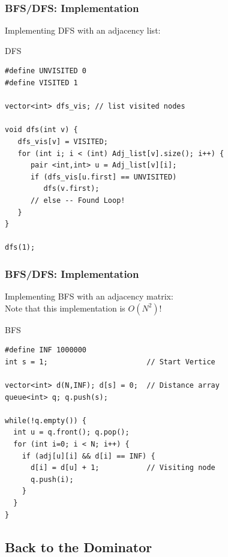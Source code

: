 \documentclass{beamer}
\begin{document}
\begin{frame}[fragile]
  \frametitle{BFS/DFS: Implementation}
  {\smaller

    Implementing DFS with an adjacency list:

  \begin{exampleblock}{DFS}
\begin{verbatim}
#define UNVISITED 0
#define VISITED 1

vector<int> dfs_vis; // list visited nodes

void dfs(int v) {
   dfs_vis[v] = VISITED;
   for (int i; i < (int) Adj_list[v].size(); i++) {
      pair <int,int> u = Adj_list[v][i];
      if (dfs_vis[u.first] == UNVISITED) 
         dfs(v.first);
      // else -- Found Loop!
   }
}

dfs(1);
\end{verbatim}
  \end{exampleblock}
  }
\end{frame}

\begin{frame}[fragile]
  \frametitle{BFS/DFS: Implementation}

  {\smaller
    Implementing BFS with an adjacency matrix:\\
    \alert{Note that this implementation is $O(N^2)$!}

               
  \begin{exampleblock}{BFS}
\begin{verbatim}
#define INF 1000000
int s = 1;                       // Start Vertice

vector<int> d(N,INF); d[s] = 0;  // Distance array
queue<int> q; q.push(s);

while(!q.empty()) {
  int u = q.front(); q.pop();
  for (int i=0; i < N; i++) {
    if (adj[u][i] && d[i] == INF) {
      d[i] = d[u] + 1;           // Visiting node
      q.push(i);
    }
  }
}
\end{verbatim}
  \end{exampleblock}
  }
\end{frame}

\subsection{Back to the Dominator}
\end{document}
